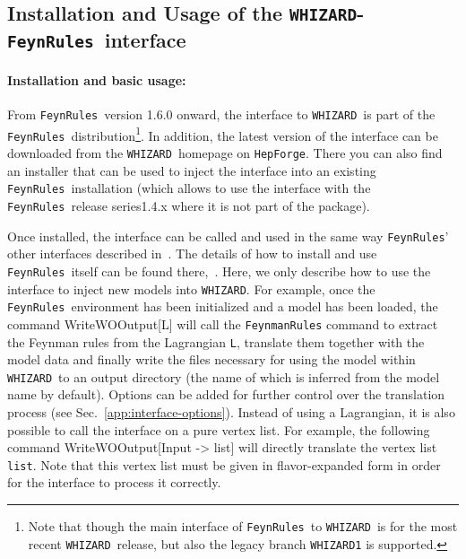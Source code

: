 \documentclass[12pt]{book}
\newenvironment{code}%
  {\begingroup\footnotesize
   \quote
   \Verbatim}%
  {\endVerbatim
   \endquote
   \endgroup\noindent}
\newcommand{\ttt}[1]{\texttt{#1}}
\newcommand{\whizard}{\ttt{WHIZARD}}
\newcommand{\FeynRules}{\ttt{FeynRules}}
\begin{document}

\subsection{Installation and Usage of the \whizard-\FeynRules\ interface}
\label{sec:interface-usage}

\paragraph{{\bf Installation and basic usage:}}
%
From \FeynRules\ version 1.6.0 onward, the interface to \whizard\ is
part of the \FeynRules\ distribution\footnote{Note that though the
  main interface of \FeynRules\ to \whizard\ is for the most recent
  \whizard\ release, but also the legacy branch
  \whizard\ttt{1} is supported.}. In addition, the latest version
of the interface can be downloaded from the \whizard\ homepage on
\ttt{HepForge}. There you can also find an installer that can be used
to inject the interface into an existing \FeynRules\
installation (which allows to use the interface with the \FeynRules\
release series1.4.x where it is not part of the package).

Once installed, the interface can be called and used in the same way
\FeynRules' other interfaces described
in~\cite{Christensen:2008py}. The details of how to install and use
\FeynRules\ itself can be found
there,~\cite{Christensen:2008py,Christensen:2009jx,Duhr:2011se}. Here,
we only describe how to use the interface to inject new models into
\whizard.  For example, once the  \FeynRules\ environment has been
initialized and a model has been loaded, the command
\begin{code}
  WriteWOOutput[L]
\end{code}
will call the \ttt{FeynmanRules} command to extract the Feynman
rules from the Lagrangian \ttt{L}, translate them together with the
model data and finally write the files necessary for using the model
within \whizard\ to an output directory (the name of which is inferred
from the model name by default). Options can be added for further
control over the translation process (see
Sec.~\ref{app:interface-options}). Instead of using a Lagrangian, it
is also possible to call the interface on a pure vertex list. For
example, the following command
\begin{code}
  WriteWOOutput[Input -> list]
\end{code}
will directly translate the vertex list \ttt{list}. Note that this
vertex list must be given in flavor-expanded form in order for the
interface to process it correctly.
\end{document}
